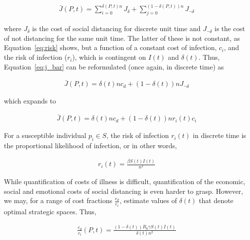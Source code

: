 \documentclass{article}
\begin{document}
\begin{equation}
	\begin{aligned}
		\bar{J}(P, t) = \sum_{i=0}^{\delta(P, t) n} J_{\delta} + \sum_{j=0}^{(1-\delta(P, t)) n} J_{\lnot \delta}
	\end{aligned}
	\label{eq:j_bar}
\end{equation}

\noindent where $J_{\delta}$ is the cost of social distancing for discrete unit time and $J_{\lnot \delta}$ is the cost of not distancing for the same unit time. The latter of these is not constant, as Equation~\eqref{eq:risk} shows, but a function of a constant cost of infection, $c_i$, and the risk of infection ($r_i$), which is contingent on $I(t)$ and $\delta(t)$. Thus, Equation~\eqref{eq:j_bar} can be reformulated (once again, in discrete time) as

\begin{equation}
	\begin{aligned}
		\bar{J}(P, t) = \delta(t) n c_d + (1 - \delta(t)) n J_{\lnot \delta}
	\end{aligned}
\end{equation}

\noindent which expands to

\begin{equation}
	\begin{aligned}
		\bar{J}(P, t) = \delta(t) n c_d + (1 - \delta(t)) n r_i(t) c_i
	\end{aligned}
\end{equation}

For a susceptible individual $p_i \in S$, the risk of infection $r_i(t)$ in discrete time is the proportional likelihood of infection, or in other words, 

\begin{equation}
	\begin{aligned}
		r_i(t) = \frac{\beta S(t) I(t)}{n^2}
	\end{aligned}
\end{equation}

While quantification of costs of illness is difficult, quantification of the economic, social and emotional costs of social distancing is even harder to grasp. However, we may, for a range of cost fractions $\frac{c_d}{c_i}$, estimate values of $\delta(t)$ that denote optimal strategic spaces. Thus, 

\begin{equation}
	\begin{aligned}
		\frac{c_d}{c_i}(P, t) = \frac{(1 - \delta(t)) R_0 \gamma S(t) I(t)}{\delta(t) n^2}
	\end{aligned}
	\label{eq:cost_fraction}
\end{equation}
\end{document}
